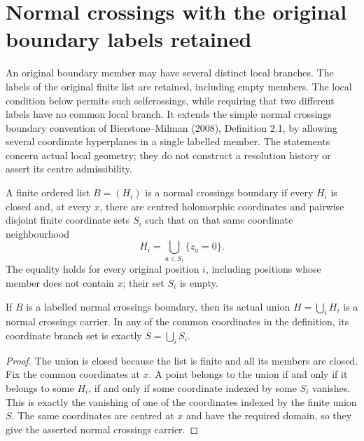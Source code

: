 \section{Normal crossings with the original boundary labels retained}
\label{sec:nc-labelled-boundary}

An original boundary member may have several distinct local branches.
The labels of the original finite list are retained, including empty
members. The local condition below permits such selfcrossings, while
requiring that two different labels have no common local branch. It
extends the simple normal crossings boundary convention of
Bierstone--Milman (2008), Definition 2.1, by allowing several coordinate hyperplanes
in a single labelled member. The statements concern actual local
geometry; they do not construct a resolution history or assert its
centre admissibility.

\begin{definition}
\label{hir:labelled-normal-crossings-boundary}
\leanok
A finite ordered list $B=(H_i)$ is a normal crossings boundary if every
$H_i$ is closed and, at every $x$, there are centred holomorphic
coordinates and pairwise disjoint finite coordinate sets $S_i$ such that
on that same coordinate neighbourhood
\[
 H_i=\bigcup_{a\in S_i}\{z_a=0\}.
\]
The equality holds for every original position $i$, including positions
whose member does not contain $x$; their set $S_i$ is empty.
\end{definition}

\begin{lemma}
\label{hir:labelled-nc-union-carrier}
\leanok
If $B$ is a labelled normal crossings boundary, then its actual union
$H=\bigcup_iH_i$ is a normal crossings carrier. In any of the common
coordinates in the definition, its coordinate branch set is exactly
$S=\bigcup_iS_i$.
\end{lemma}
\begin{proof}
The union is closed because the list is finite and all its members are
closed. Fix the common coordinates at $x$. A point belongs to the union
if and only if it belongs to some $H_i$, if and only if some coordinate
indexed by some $S_i$ vanishes. This is exactly the vanishing of one of
the coordinates indexed by the finite union $S$. The same coordinates
are centred at $x$ and have the required domain, so they give the
asserted normal crossings carrier.
\end{proof}

